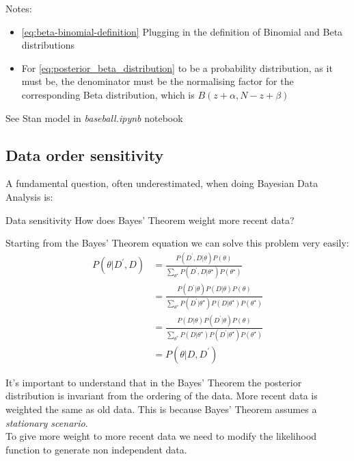 \documentclass[11pt]{beamer}
\begin{document}
\begin{frame}
	Notes:
	\begin{itemize}
	\item \eqref{eq:beta-binomial-definition} Plugging in the definition of Binomial and Beta distributions 
	\item For \eqref{eq:posterior_beta_distribution} to be a probability distribution, as it must be, the denominator must be the normalising factor for the corresponding Beta distribution, which is $B(z + \alpha, N - z + \beta)$
	\end{itemize}
\end{frame}

\begin{frame}
	See Stan model in \textit{baseball.ipynb} notebook
\end{frame}


\subsection{Data order sensitivity}
\begin{frame}
	A fundamental question, often underestimated, when doing Bayesian Data Analysis is: 
	\begin{block}{Data sensitivity}
	How does Bayes' Theorem weight more recent data?
	\end{block}
\end{frame}

\begin{frame}
	Starting from the Bayes' Theorem equation we can solve this problem very easily:
	\begin{align}
		P(\theta | D^{\prime}, D) &= \frac{P(D^{\prime}, D | \theta) P(\theta)}{\sum_{\theta^{\star}} P(D^{\prime}, D | \theta^{\star}) P(\theta^{\star})} \\ 
		&= \frac{P(D^{\prime} | \theta) P(D | \theta) P(\theta)}{\sum_{\theta^{\star}} P(D^{\prime} | \theta^{\star}) P(D | \theta^{\star}) P(\theta^{\star})} \\
		&= \frac{P(D | \theta) P(D^{\prime} | \theta) P(\theta)}{\sum_{\theta^{\star}} P(D | \theta^{\star}) P(D^{\prime} | \theta^{\star}) P(\theta^{\star})} \\
		&= P(\theta | D, D^{\prime})
	\end{align}
\end{frame}

\begin{frame}
	It's important to understand that in the Bayes' Theorem the posterior distribution is invariant from the ordering of the data. More recent data is weighted the same as old data. This is because Bayes' Theorem assumes a \textit{stationary scenario}. \\
	To give more weight to more recent data we need to modify the likelihood function to generate non independent data.
\end{frame}
\end{document}
